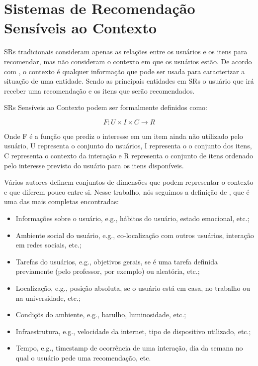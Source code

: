 \section{Sistemas de Recomendação Sensíveis ao Contexto}

SRs tradicionais consideram apenas as relações entre os usuários e os itens para recomendar, mas não consideram o
contexto em que os usuários estão. De acordo com , o contexto é qualquer informação
que pode ser usada para caracterizar a situação de uma entidade. Sendo as principais entidades em SRs o usuário que
irá receber uma recomendação e os itens que serão recomendados.

SRs Sensíveis ao Contexto podem ser formalmente definidos como:

\begin{equation}
  F: U \times I \times C \rightarrow R
  \label{eq:context-aware}
\end{equation}

Onde F é a função que prediz o interesse em um item ainda não utilizado pelo usuário, U representa o conjunto do
usuários, I representa o o conjunto dos itens, C representa o contexto da interação e R representa o conjunto de itens
ordenado pelo interesse previsto do usuário para os itens disponíveis.

Vários autores definem conjuntos de dimensões que podem representar o contexto
\cite{schilit1994context, chen2000survey, zimmermann2007operational} e que diferem pouco entre si. Nesse trabalho,
nós seguimos a definição de , que é uma das mais completas encontradas:

\begin{itemize}
\item Informações sobre o usuário, e.g., hábitos do usuário, estado emocional, etc.;
\item Ambiente social do usuário, e.g., co-localização com outros usuários, interação em redes sociais, etc.;
\item Tarefas do usuários, e.g., objetivos gerais, se é uma tarefa definida previamente (pelo professor, por exemplo)
ou aleatória, etc.;
\item Localização, e.g., posição absoluta, se o usuário está em casa, no trabalho ou na universidade, etc.;
\item Condiçõs do ambiente, e.g., barulho, luminosidade, etc.;
\item Infraestrutura, e.g., velocidade da internet, tipo de dispositivo utilizado, etc.;
\item Tempo, e.g., timestamp de ocorrência de uma interação, dia da semana no qual o usuário pede uma recomendação, etc.
\end{itemize}

